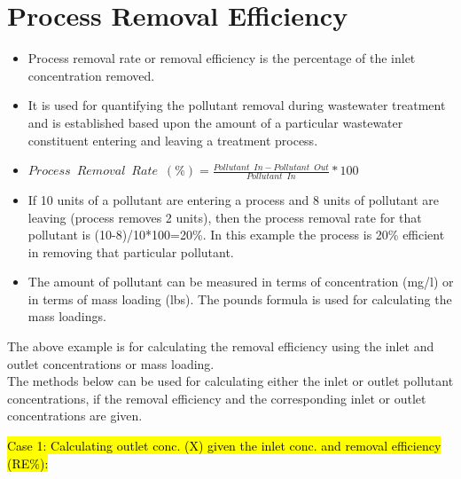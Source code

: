 \chapter{Process Removal Efficiency}

\begin{itemize}
\item Process removal rate or removal efficiency is the percentage of the inlet concentration removed.  
\item It is used for quantifying the pollutant removal during wastewater treatment and is established based upon the amount of a particular wastewater constituent entering and leaving a treatment process.

\item $Process \enspace Removal \enspace Rate \enspace (\%) = \frac{Pollutant \enspace  In-Pollutant\enspace  Out}{Pollutant \enspace In}*100$\\

\item If 10 units of a pollutant are entering a process and 8 units of pollutant are leaving (process removes 2 units), then the process removal rate for that pollutant is (10-8)/10*100=20\%.  In this example the process is 20\% efficient in removing that particular pollutant.

\item The amount of pollutant can be measured in terms of concentration (mg/l) or in terms of mass loading (lbs).  The pounds formula is used for calculating the mass loadings.  
\end{itemize}
The above example is for calculating the removal efficiency using the inlet and outlet concentrations or mass loading.\\
The methods below can be used for calculating either the inlet or outlet pollutant concentrations, if the removal efficiency and the corresponding inlet or outlet concentrations are given. 


\hl{Case 1:  Calculating outlet conc. (X) given the inlet conc. and removal efficiency (RE\%):}

